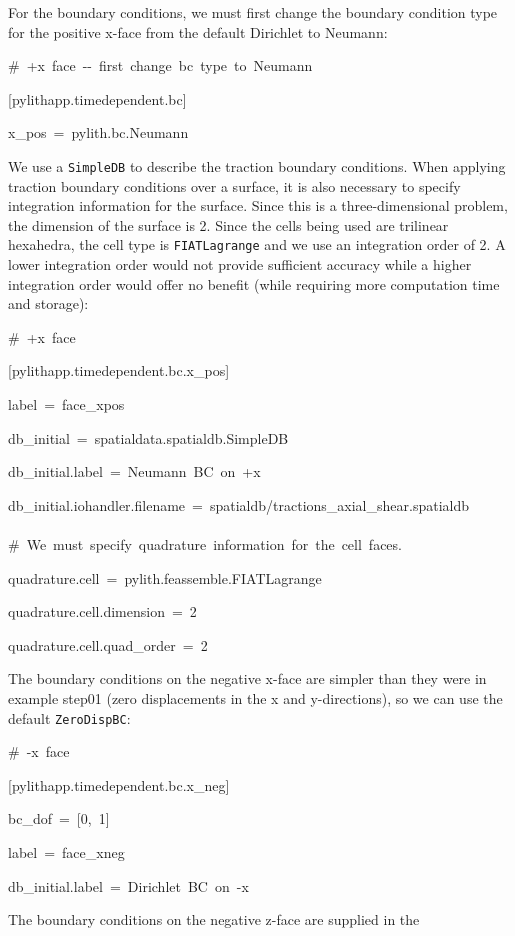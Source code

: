 For the boundary conditions, we must first change the boundary condition
type for the positive x-face from the default Dirichlet to Neumann:
\begin{lyxcode}
\#~+x~face~-{}-~first~change~bc~type~to~Neumann

{[}pylithapp.timedependent.bc{]}

x\_pos~=~pylith.bc.Neumann~
\end{lyxcode}
We use a \texttt{SimpleDB} to describe the traction boundary conditions.
When applying traction boundary conditions over a surface, it is also
necessary to specify integration information for the surface. Since
this is a three-dimensional problem, the dimension of the surface
is 2. Since the cells being used are trilinear hexahedra, the cell
type is \texttt{FIATLagrange} and we use an integration order of 2.
A lower integration order would not provide sufficient accuracy while
a higher integration order would offer no benefit (while requiring
more computation time and storage):
\begin{lyxcode}
\#~+x~face

{[}pylithapp.timedependent.bc.x\_pos{]}

label~=~face\_xpos

db\_initial~=~spatialdata.spatialdb.SimpleDB

db\_initial.label~=~Neumann~BC~on~+x

db\_initial.iohandler.filename~=~spatialdb/tractions\_axial\_shear.spatialdb~\\
~\\


\#~We~must~specify~quadrature~information~for~the~cell~faces.

quadrature.cell~=~pylith.feassemble.FIATLagrange

quadrature.cell.dimension~=~2

quadrature.cell.quad\_order~=~2~
\end{lyxcode}
The boundary conditions on the negative x-face are simpler than they
were in example step01 (zero displacements in the x and y-directions),
so we can use the default \texttt{ZeroDispBC}:
\begin{lyxcode}
\#~-x~face

{[}pylithapp.timedependent.bc.x\_neg{]}

bc\_dof~=~{[}0,~1{]}~

label~=~face\_xneg

db\_initial.label~=~Dirichlet~BC~on~-x~
\end{lyxcode}
The boundary conditions on the negative z-face are supplied in the
